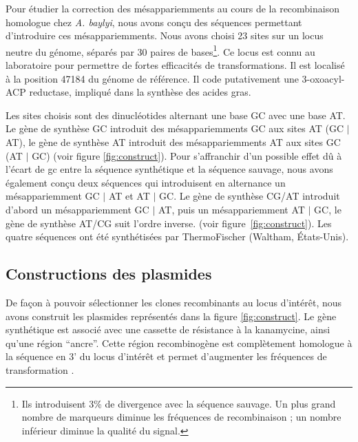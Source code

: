Pour étudier la correction des mésappariemments au cours de la recombinaison
homologue chez \emph{A. baylyi}, nous avons conçu des séquences permettant
d'introduire ces mésappariemments. Nous avons choisi 23 sites sur un locus
neutre du génome, séparés par 30 paires de bases\footnote{Ils introduisent 3\%
  de divergence avec la séquence sauvage. Un plus grand nombre de marqueurs
  diminue les fréquences de recombinaison ; un nombre inférieur diminue la
  qualité du signal.}. Ce locus est connu au laboratoire pour permettre de
fortes efficacités de transformations. Il est localisé à la position 47184 du
génome de référence. Il code putativement une 3-oxoacyl-ACP reductase, impliqué
dans la synthèse des acides gras\cite{vallenet_microscopeintegrated_2013}.

Les sites choisis sont des dinucléotides alternant une base GC avec une base AT.
Le gène de synthèse GC introduit des mésappariemments GC aux sites AT (GC $|$
AT), le gène de synthèse AT introduit des mésappariemments AT aux sites GC (AT
$|$ GC) (voir figure \ref{fig:construct}). Pour s'affranchir d'un possible effet
dû à l'écart de \ac{gc} entre la séquence synthétique et la séquence sauvage,
nous avons également conçu deux séquences qui introduisent en alternance un
mésappariemment GC $|$ AT et AT $|$ GC. Le gène de synthèse CG/AT introduit
d'abord un mésappariemment GC $|$ AT, puis un mésappariemment AT $|$ GC, le gène
de synthèse AT/CG suit l'ordre inverse. (voir figure~\ref{fig:construct}). Les
quatre séquences ont été synthétisées par ThermoFischer (Waltham, États-Unis).

\subsection{Constructions des plasmides}
\label{subsec:constructions}

De façon à pouvoir sélectionner les clones recombinants au locus d'intérêt, nous
avons construit les plasmides représentés dans la figure \ref{fig:construct}. Le
gène synthétique est associé avec une cassette de résistance à la kanamycine,
ainsi qu'une région ``ancre''. Cette région recombinogène est complètement
homologue à la séquence en 3' du locus d'intérêt et permet d'augmenter les
fréquences de transformation \cite{de_vries_integration_2002,meier_mechanisms_2003}.

